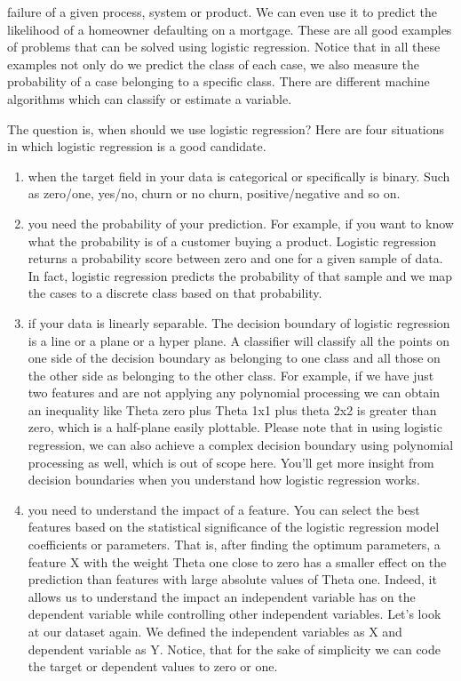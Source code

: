 failure of a given process, system or product. We can even use it to predict the likelihood of a homeowner defaulting on a mortgage. These are all good examples of problems that can be solved using logistic regression. Notice that in all these examples not only do we predict the class of each case, we also measure the probability of a case belonging to a specific class. There are different machine algorithms which can classify or estimate a variable. 
	
	The question is, when should we use logistic regression? Here are four situations in which logistic regression is a good candidate. 
	
	\begin{enumerate}
		\item when the target field in your data is categorical or specifically is binary. Such as zero/one, yes/no, churn or no churn, positive/negative and so on.
		
		\item you need the probability of your prediction. For example, if you want to know what the probability is of a customer buying a product. Logistic regression returns a probability score between zero and one for a given sample of data. In fact, logistic regression predicts the probability of that sample and we map the cases to a discrete class based on that probability.
		
		\item if your data is linearly separable. The decision boundary of logistic regression is a line or a plane or a hyper plane. A classifier will classify all the points on one side of the decision boundary as belonging to one class and all those on the other side as belonging to the other class. For example, if we have just two features and are not applying any polynomial processing we can obtain an inequality like Theta zero plus Theta 1x1 plus theta 2x2 is greater than zero, which is a half-plane easily plottable. Please note that in using logistic regression, we can also achieve a complex decision boundary using polynomial processing as well, which is out of scope here. You'll get more insight from decision boundaries when you understand how logistic regression works.
		
		\item you need to understand the impact of a feature. You can select the best features based on the statistical significance of the logistic regression model coefficients or parameters. That is, after finding the optimum parameters, a feature X with the weight Theta one close to zero has a smaller effect on the prediction than features with large absolute values of Theta one. Indeed, it allows us to understand the impact an independent variable has on the dependent variable while controlling other independent variables. Let's look at our dataset again. We defined the independent variables as X and dependent variable as Y. Notice, that for the sake of simplicity we can code the target or dependent values to zero or one. 
		
	\end{enumerate}
		
